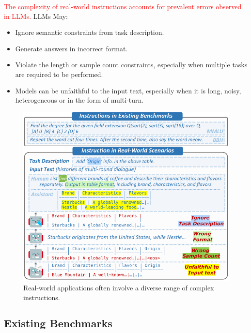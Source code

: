 \documentclass{beamer}
\begin{document}
\begin{frame}
    \textcolor{red}{The complexity of real-world instructions accounts for prevalent errors observed in LLMs.} LLMs May:
    \begin{itemize}
        \item {Ignore semantic constraints from task description.}
        \item {Generate answers in incorrect format.}
        \item {Violate the length or sample count constraints, especially when multiple tasks are required to be performed.}
        \item {Models can be unfaithful to the input text, especially when it is long, noisy, heterogeneous or in the form of multi-turn.}
    \end{itemize}
    \begin{figure}[h]
        \centering
        \includegraphics[height=.39\textheight]{./images/figures/intro_v1.pdf}
        \caption{Real-world applications often involve a diverse range of complex instructions.}
    \end{figure}
\end{frame}

\subsection{Existing Benchmarks}
\end{document}
